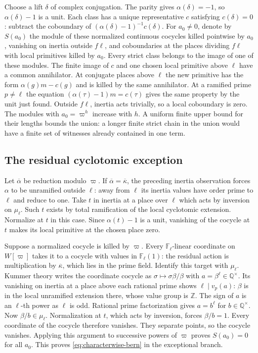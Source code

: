 Choose a lift \(\delta\) of complex conjugation. The parity gives
\(\alpha(\delta)=-1\), so \(\alpha(\delta)-1\) is a unit. Each
class has a unique representative \(c\) satisfying \(c(\delta)=0\):
subtract the coboundary of
\((\alpha(\delta)-1)^{-1}c(\delta)\).
For \(a_0\ne0\), denote by \(S(a_0)\) the module of these normalized
continuous cocycles killed pointwise by \(a_0\), vanishing on inertia
outside \(f\ell\), and coboundaries at the places dividing \(f\ell\)
with local primitives killed by \(a_0\). Every strict class belongs
to the image of one of these modules. The finite image of \(c\) and
one chosen local primitive above \(\ell\) have a common annihilator.
At conjugate places above \(\ell\) the new primitive has the form
\(\alpha(g)m-c(g)\) and is killed by the same annihilator. At a
ramified prime \(p\ne\ell\) the equation
\((\alpha(\tau)-1)m=c(\tau)\) gives the same property by the unit
just found. Outside \(f\ell\), inertia acts trivially, so a local
coboundary is zero. The modules with \(a_0=\varpi^h\) increase with
\(h\). A uniform finite upper bound for their lengths bounds the union:
a longer finite strict chain in the union would have a finite set of
witnesses already contained in one term.

\subsection{The residual cyclotomic exception}

Let \(\overline{\alpha}\) be reduction modulo \(\varpi\). If
\(\overline\alpha=\overline\kappa\), the preceding inertia observation
forces \(\alpha\) to be unramified outside \(\ell\): away from \(\ell\)
its inertia values have order prime to \(\ell\) and reduce to one.
Take \(t\) in inertia at a place over \(\ell\) which acts by inversion
on \(\mu_\ell\). Such \(t\) exists by total ramification of the local
cyclotomic extension. Normalize at \(t\) in this case.
Since \(\alpha(t)-1\) is a unit, vanishing of the cocycle at \(t\)
makes its local primitive at the chosen place zero.

Suppose a normalized cocycle is killed by \(\varpi\). Every
\(\mathbb F_\ell\)-linear coordinate on \(W[\varpi]\) takes it to a
cocycle with values in \(\mathbb F_\ell(1)\): the residual action is
multiplication by \(\overline\kappa\), which lies in the prime field.
Identify this target with \(\mu_\ell\). Kummer theory writes the
coordinate cocycle as \(\sigma\mapsto\sigma\beta/\beta\) with
\(a=\beta^\ell\in\mathbb Q^\times\). Its vanishing on inertia at
a place above each rational prime shows \(\ell\mid v_p(a)\):
\(\beta\) is in the local unramified extension there, whose value
group is \(\mathbb Z\). The sign of \(a\) is an \(\ell\)-th power
as \(\ell\) is odd. Rational prime factorization gives
\(a=b^\ell\) for \(b\in\mathbb Q^\times\).
Now \(\beta/b\in\mu_\ell\). Normalization at \(t\), which acts by
inversion, forces \(\beta/b=1\). Every coordinate of the cocycle
therefore vanishes. They separate points, so the cocycle vanishes.
Applying this argument to successive powers of \(\varpi\) proves
\(S(a_0)=0\) for all \(a_0\). This proves
\eqref{eq:characterwise-bern} in the exceptional branch.

